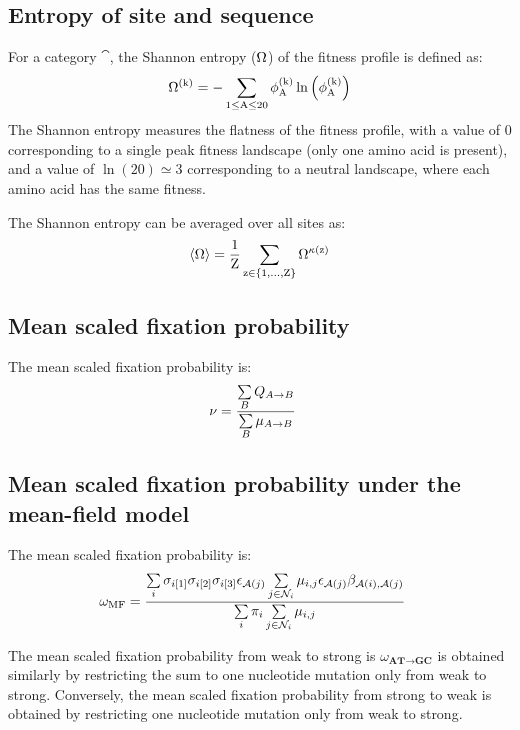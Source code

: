 \subsection{Entropy of site and sequence}
\label{subsec:entropy}

For a category $\cat$, the Shannon entropy (${\Omega}$) of the fitness profile is defined as:
\begin{equation}
    {\Omega}^{(\text{k})} = - \sum\limits_{1 \leq \text{A} \leq 20} \phi^{(\text{k})}_{\text{A}} \ln \left( \phi^{(\text{k})}_{\text{A}} \right)
\end{equation}
The Shannon entropy measures the flatness of the fitness profile, with a value of $0$ corresponding to a single peak fitness landscape (only one amino acid is present), and a value of $\ln(20)\simeq3$ corresponding to a neutral landscape, where each amino acid has the same fitness.

The Shannon entropy can be averaged over all sites as:
\begin{equation}
    \left\langle {\Omega} \right\rangle = \dfrac{1}{\text{Z}}\sum\limits_{\text{z} \in \{1, \hdots, \text{Z}\}} {\Omega}^{\kappa\left(\text{z}\right)}
\end{equation}

\subsection{Mean scaled fixation probability}
\label{subsec:fixation-bias}
The mean scaled fixation probability is:
\begin{align}
    \nu & = \dfrac{ \sum\limits_{B} Q_{A \to B}}{ \sum\limits_{B} \mu_{A \to B}}
\end{align}

\subsection{Mean scaled fixation probability under the mean-field model}
\label{sec-mut-bias:mean-field-omega}

The mean scaled fixation probability is:
\begin{align}
    \omega_{\text{MF}} & = \dfrac{ \sum\limits_{i} \sigma_{{i}[1]}\sigma_{{i}[2]}\sigma_{{i}[3]} \epsilon_{\mathcal{A}({j})} \sum\limits_{j \in \mathcal{N}_{{i}}} \mu_{{i}, {j}} \epsilon_{\mathcal{A}({j})} \beta_{\mathcal{A}({i}), \mathcal{A}({j})} }{\sum\limits_{i} \pi_{i} \sum\limits_{j \in \mathcal{N}_{{i}} } \mu_{{i}, {j}}}
\end{align}

The mean scaled fixation probability from weak to strong is $\omega_{\textbf{AT} \rightarrow \textbf{GC}}$ is obtained similarly by restricting the sum to one nucleotide mutation only from weak to strong.
Conversely, the mean scaled fixation probability from strong to weak is obtained by restricting one nucleotide mutation only from weak to strong.

